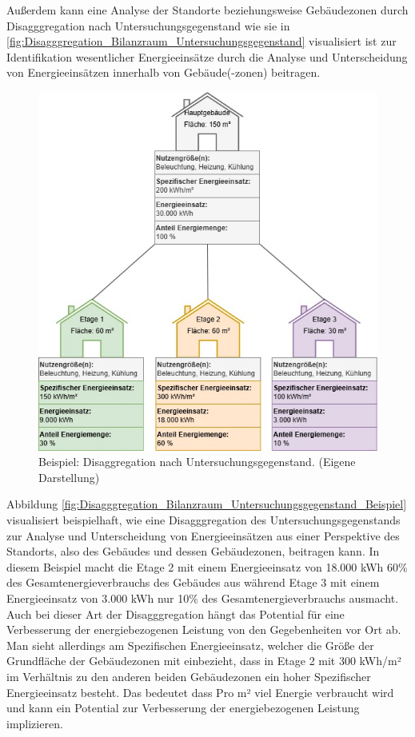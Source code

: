 Außerdem kann eine Analyse der Standorte beziehungsweise Gebäudezonen durch Disagggregation nach Untersuchungsgegenstand wie sie in 
\eqref{fig:Disagggregation_Bilanzraum_Untersuchungsgegenstand} visualisiert ist zur Identifikation wesentlicher Energieeinsätze durch die Analyse und Unterscheidung 
von Energieeinsätzen innerhalb von Gebäude(-zonen) beitragen.
\begin{figure}[H]
    \centering
    \includegraphics[width=1\textwidth]{../../Ressourcen/Abbildungen/Untersuchungsgegenstand_Zerlegt_Beispiel.jpg}
    \caption{Beispiel: Disaggregation nach Untersuchungsgegenstand. (Eigene Darstellung)}
    \label{fig:Disagggregation_Bilanzraum_Untersuchungsgegenstand_Beispiel}
\end{figure}
Abbildung \eqref{fig:Disagggregation_Bilanzraum_Untersuchungsgegenstand_Beispiel} visualisiert beispielhaft, wie eine Disagggregation des Untersuchungsgegenstands 
zur Analyse und Unterscheidung von Energieeinsätzen aus einer Perspektive des Standorts, also des Gebäudes und dessen Gebäudezonen, beitragen kann.
In diesem Beispiel macht die Etage 2 mit einem Energieeinsatz von 18.000 kWh 60\% des Gesamtenergieverbrauchs des Gebäudes aus während Etage 3 mit 
einem Energieeinsatz von 3.000 kWh nur 10\% des Gesamtenergieverbrauchs ausmacht.
Auch bei dieser Art der Disagggregation hängt das Potential für eine Verbesserung der energiebezogenen Leistung von den Gegebenheiten vor Ort ab.
Man sieht allerdings am Spezifischen Energieeinsatz, welcher die Größe der Grundfläche der Gebäudezonen mit einbezieht, dass in Etage 2 mit 300 kWh/m² 
im Verhältnis zu den anderen beiden Gebäudezonen ein hoher Spezifischer Energieeinsatz besteht. 
Das bedeutet dass Pro m² viel Energie verbraucht wird und kann ein Potential zur Verbesserung der energiebezogenen Leistung implizieren.


